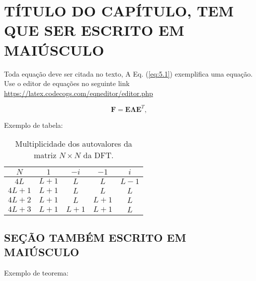 \chapter[TÍTULO CURTO PARA APARECER NO SUMÁRIO(CASO NECESSÁRIO)]{TÍTULO DO CAPÍTULO, TEM QUE SER ESCRITO EM MAIÚSCULO}
\label{cap_Exemplo}

Toda equação deve ser citada no texto, A Eq. (\ref{eq:5.1}) exemplifica uma equação. Use o editor de equações no seguinte link \url{https://latex.codecogs.com/eqneditor/editor.php}

\begin{equation}\label{eq:5.1}
\mathbf{F}=\mathbf{E}\mathbf{\Lambda}\mathbf{E}^T,
\end{equation}

Exemplo de tabela:

\begin{table}[htb]
\ABNTEXfontereduzida
\caption[Multiplicidade dos autovalores da matriz $N \times N$ da DFT.]{Multiplicidade dos autovalores da matriz $N \times N$ da DFT.}
\label{tab:eigenval_real}
\begin{center}
	\begin{tabular}{c|cccc}
          \hline
            $N$  &  $1$    &  $-i$   &  $-1$ &  $i$  \\ \hline
        $4L$  & $L+1$ & $L  $ & $L$ & $L-1  $  \\ [3pt]
        $4L+1$& $L+1$ & $L  $ & $L  $ & $L  $  \\ [3pt]
        $4L+2$& $L+1$ & $L$ & $L+1  $ & $L  $ \\ [3pt]
        $4L+3$& $L+1$ & $L+1$ & $L+1  $ & $L$\\ [3pt]
          \hline
        \end{tabular}
\end{center}       
\end{table}

\section{SEÇÃO TAMBÉM ESCRITO EM MAIÚSCULO}\label{sec:related}

Exemplo de teorema:

